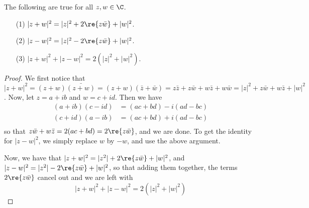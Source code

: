 \begin{lemma}\label{1.1.5}
    The following are true for all $z,w \in \C$.
    \begin{enumerate}
        \item[(1)] $|z+w|^2=|z|^2+2\re{z\bar{w}}+|w|^2$.

        \item[(2)] $|z-w|^2=|z|^2-2\re{z\bar{w}}+|w|^2$.

        \item[(3)] $|z+w|^2+|z-w|^2=2(|z|^2+|w|^2)$.
    \end{enumerate}
\end{lemma}
\begin{proof}
    We first notice that
    $|z+w|^2=(z+w)\bar{(z+w)}=(z+w)(\bar{z}+\bar{w})=z\bar{z}+z\bar{w}+w\bar{z}+
    w\bar{w}=|z|^2+z\bar{w}+w\bar{z}+|w|^2$. Now, let $z=a+ib$ and
    $w=c+id$. Then we have
    \begin{align*}
        (a+ib)(c-id)    &=  (ac+bd)-i(ad-bc)    \\
        (c+id)(a-ib)    &=  (ac+bd)+i(ad-bc)    \\
    \end{align*}
    so that $z\bar{w}+w\bar{z}=2(ac+bd)=2\re{z\bar{w}}$, and we are done. To get
    the identity for $|z-w|^2$, we simply replace $w$ by  $-w$, and use the
    above argument.

    Now, we have that  $|z+w|^2=|z^2|+2\re{z\bar{w}}+|w|^2$, and
    $|z-w|^2=|z^2|-2\re{z\bar{w}}+|w|^2$, so that adding them together,
    the terms $2\re{z\bar{w}}$ cancel out and we are left with
    \begin{equation*}
        |z+w|^2+|z-w|^2=2(|z|^2+|w|^2)
    \end{equation*}
\end{proof}

